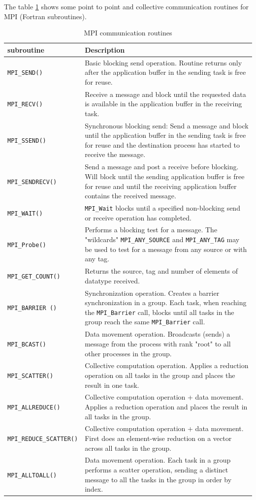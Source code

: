 The table \ref{MPItable} shows some point to point and collective communication routines for MPI (Fortran subroutines).
\begin{table}[!h]
\centering
\begin{tabularx}{\linewidth}{|X|X|}
\hline
\textbf{subroutine} & \textbf{Description} \\
\hline
\hline
\verb|MPI_SEND()| & Basic blocking send operation. Routine returns only after the application buffer in the sending task is free for reuse. \\
\hline
\verb|MPI_RECV()| & Receive a message and block until the requested data is available in the application buffer in the receiving task. \\
\hline
\verb|MPI_SSEND()| & Synchronous blocking send: Send a message and block until the application buffer in the sending task is free for reuse and the destination process has started to receive the message. \\
\hline
\verb|MPI_SENDRECV()| & Send a message and post a receive before blocking. Will block until the sending application buffer is free for reuse and until the receiving application buffer contains the received message. \\
\hline
\verb|MPI_WAIT()| & \verb|MPI_Wait| blocks until a specified non-blocking send or receive operation has completed. \\
\hline
\verb|MPI_Probe()| & Performs a blocking test for a message. The "wildcards" \verb|MPI_ANY_SOURCE| and \verb|MPI_ANY_TAG| may be used to test for a message from any source or with any tag. \\
\hline
\verb|MPI_GET_COUNT()| & Returns the source, tag and number of elements of datatype received.\\
\hline
\verb|MPI_BARRIER ()| & Synchronization operation. Creates a barrier synchronization in a group. Each task, when reaching the \verb|MPI_Barrier| call, blocks until all tasks in the group reach the same \verb|MPI_Barrier| call. \\
\hline
\verb|MPI_BCAST()| & Data movement operation. Broadcasts (sends) a message from the process with rank "root" to all other processes in the group.\\
\hline
\verb|MPI_SCATTER()| & Collective computation operation. Applies a reduction operation on all tasks in the group and places the result in one task. \\
\hline
\verb|MPI_ALLREDUCE()| & Collective computation operation + data movement. Applies a reduction operation and places the result in all tasks in the group. \\
\hline
\verb|MPI_REDUCE_SCATTER()| & Collective computation operation + data movement. First does an element-wise reduction on a vector across all tasks in the group. \\
\hline
\verb|MPI_ALLTOALL()| & Data movement operation. Each task in a group performs a scatter operation, sending a distinct message to all the tasks in the group in order by index.\\
\hline
\end{tabularx}
\caption{\label{MPItable} MPI communication routines}
\end{table}

